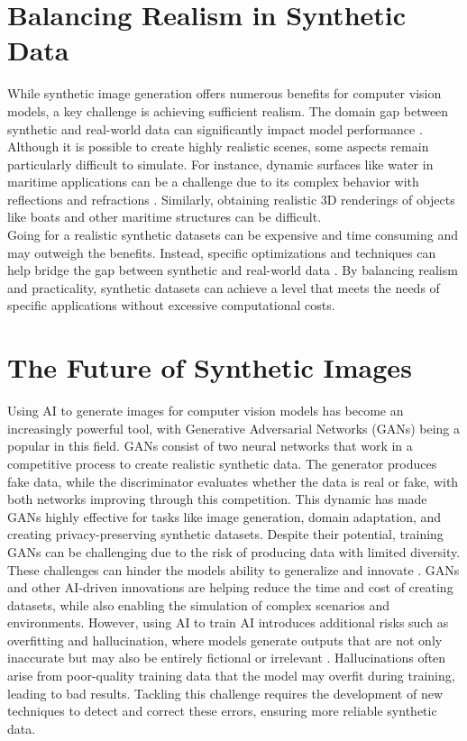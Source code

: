 \section{Balancing Realism in Synthetic Data}
While synthetic image generation offers numerous benefits for computer vision models, a key challenge is achieving sufficient realism. The domain gap between synthetic and real-world data can significantly impact model performance \cite{nikolenko2021synthetic}.  Although it is possible to create highly realistic scenes, some aspects remain particularly difficult to simulate. For instance, dynamic surfaces like water in maritime applications can be a challenge due to its complex behavior with reflections and refractions \cite{waterrendering}. Similarly, obtaining realistic 3D renderings of objects like boats and other maritime structures can be difficult.\\

\noindent Going for a realistic synthetic datasets can be expensive and time consuming and may outweigh the benefits. Instead, specific optimizations and techniques can help bridge the gap between synthetic and real-world data \cite{nikolenko2021synthetic, jimaging8110310}. By balancing realism and practicality, synthetic datasets can achieve a level that meets the needs of specific applications without excessive computational costs.


\section{The Future of Synthetic Images}

Using AI to generate images for computer vision models has become an increasingly powerful tool, with Generative Adversarial Networks (GANs) being a popular in this field. GANs consist of two neural networks that work in a competitive process to create realistic synthetic data. The generator produces fake data, while the discriminator evaluates whether the data is real or fake, with both networks improving through this competition. This dynamic has made GANs highly effective for tasks like image generation, domain adaptation, and creating privacy-preserving synthetic datasets. Despite their potential, training GANs can be challenging due to the risk of producing data with limited diversity. These challenges can hinder the models ability to generalize and innovate \cite{gan}. GANs and other AI-driven innovations are helping reduce the time and cost of creating datasets, while also enabling the simulation of complex scenarios and environments. However, using AI to train AI introduces additional risks such as overfitting and hallucination, where models generate outputs that are not only inaccurate but may also be entirely fictional or irrelevant \cite{hallucination}. Hallucinations often arise from poor-quality training data that the model may overfit during training, leading to bad results. Tackling this challenge requires the development of new techniques to detect and correct these errors, ensuring more reliable synthetic data.

